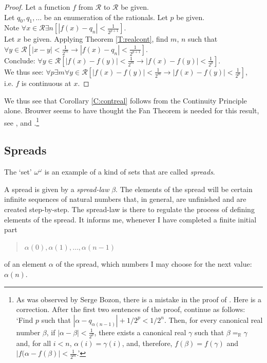 \documentclass[a4paper]{amsart}
\theoremstyle{plain}
\begin{document}
\begin{proof} Let a function $f$ from $\mathcal{R}$ to $\mathcal{R}$ be given. 
\\Let $q_0, q_1, \ldots$ be an enumeration of the rationals.
Let $p$ be given.  \\Note $\forall x \in \mathcal{R}\exists n[|f(x) -  q_n| < \frac{1}{2^{p+1}}]$.  \\Let $x$ be given. Applying Theorem \ref{T:realcont}, find $m$, $n$ such that \\$\forall y \in \mathcal{R}[|x-y|<\frac{1}{2^m} \rightarrow |f(x) - q_n|< \frac{1}{2^{p+1}}]$. \\Conclude: $\forall y \in \mathcal{R}[|f(x)-f(y)|< \frac{1}{2^m}\rightarrow|f(x)-f(y)|<\frac{1}{2^p}]$. \\We thus see: $\forall p\exists m\forall y \in \mathcal{R}[|f(x)-f(y)|< \frac{1}{2^m}\rightarrow|f(x)-f(y)|<\frac{1}{2^p}]$,\\
 i.e. $f$ is continuous at $x$. \end{proof}
We thus see that Corollary \ref{C:contreal} follows from the Continuity Principle alone. Brouwer seems to have thought the Fan Theorem is needed for this result, see \cite{brouwer27}, \cite{veldman1982} and \cite{veldman2001}.\footnote{As was observed by Serge Bozon, there is a mistake in the proof of \cite[Theorem 2.6]{veldman2001}.  Here is a correction. After the first two sentences of the proof, continue as follows: `Find $p$ such that $|\alpha-q_{\alpha(n-1)}|+1/2^p < 1/2^n$. Then, for every canonical real number $\beta$, if $|\alpha-\beta|<\frac{1}{2^p}$, there exists a canonical real $\gamma$ such that $\beta=_\mathbb{R}\gamma$ and, for all $i<n$, $\alpha(i)=\gamma(i)$, and, therefore, $f(\beta)=f(\gamma)$ and $|f(\alpha-f(\beta)|<\frac{1}{2^m}$.'}
\subsection{Spreads} The `set'  $\omega^\omega$ is an example of a kind of sets that are called {\it spreads}.

A spread is  given by a {\it spread-law} $\beta$. The elements of the spread will be certain infinite sequences of natural numbers that, in general, are unfinished and are created step-by-step. The spread-law is there to regulate the process of defining elements of the spread. It informs me, whenever I have completed a finite initial part \begin{quote} $\alpha(0), \alpha(1), \ldots, \alpha(n-1)$ \end{quote}  of  an element $\alpha$ of the spread, which numbers I  may choose for the next value: $\alpha(n)$.  
\end{document}
